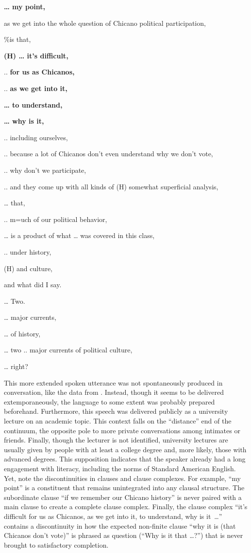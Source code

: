\textbf{… my point,}

as we get into the whole question of Chicano political participation,

\%is that,

\textbf{(H) … it's difficult,}

.. \textbf{for us as Chicanos,}

.. \textbf{as we get into it,}

\textbf{… to understand,}

\textbf{… why is it,}

.. including ourselves,

.. because a lot of Chicanos don’t even understand why we don't vote,

.. why don't we participate,

.. and they come up with all kinds of (H) somewhat superficial analysis,

… that,

.. m=uch of our political behavior,

… is a product of what … was covered in this class,

.. under history,

(H) and culture,

and what did I say.

… Two.

… major currents,

… of history,

… two .. major currents of political culture,

… right?
    \z

\noindent This more extended spoken utterance was not spontaneously produced in conversation, like the data from \citet{MillerWeinert1998}. Instead, though it seems to be delivered extemporaneously, the language to some extent was probably prepared beforehand. Furthermore, this speech was delivered publicly as a university lecture on an academic topic. This context falls on the “distance” end of the continuum, the opposite pole to more private conversations among intimates or friends. Finally, though the lecturer is not identified, university lectures are usually given by people with at least a college degree and, more likely, those with advanced degrees. This supposition indicates that the speaker already had a long engagement with literacy, including the norms of Standard American English. Yet, note the discontinuities in clauses and clause complexes. For example, “my point” is a constituent that remains unintegrated into any clausal structure. The subordinate clause “if we remember our Chicano history” is never paired with a main clause to create a complete clause complex. Finally, the clause complex “it’s difficult for us as Chicanos, as we get into it, to understand, why is it~…” contains a discontinuity in how the expected non-finite clause “why it is (that Chicanos don’t vote)” is phrased as question (“Why is it that …?”) that is never brought to satisfactory completion.

